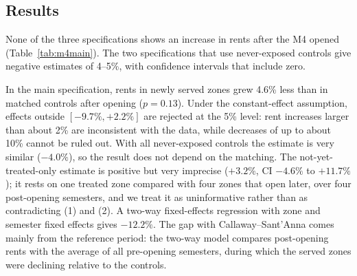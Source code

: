 \subsection*{Results}

None of the three specifications shows an increase in rents after the M4 opened (Table~\ref{tab:m4main}). The two specifications that use never-exposed controls give negative estimates of 4--5\%, with confidence intervals that include zero.

\begin{table}[tbhp]
\centering
\caption{Effect of the M4 opening on log rents: Callaway--Sant'Anna estimates}
\label{tab:m4main}
\end{table}

In the main specification, rents in newly served zones grew 4.6\% less than in matched controls after opening ($p=0.13$). Under the constant-effect assumption, effects outside $[-9.7\%,+2.2\%]$ are rejected at the 5\% level: rent increases larger than about 2\% are inconsistent with the data, while decreases of up to about 10\% cannot be ruled out. With all never-exposed controls the estimate is very similar ($-4.0\%$), so the result does not depend on the matching. The not-yet-treated-only estimate is positive but very imprecise ($+3.2\%$, CI $-4.6\%$ to $+11.7\%$); it rests on one treated zone compared with four zones that open later, over four post-opening semesters, and we treat it as uninformative rather than as contradicting (1) and (2). A two-way fixed-effects regression with zone and semester fixed effects gives $-12.2\%$. The gap with Callaway--Sant'Anna comes mainly from the reference period: the two-way model compares post-opening rents with the average of all pre-opening semesters, during which the served zones were declining relative to the controls.

